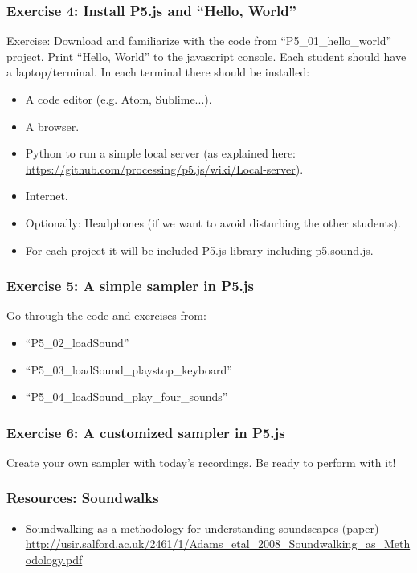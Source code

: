 \documentclass[screen, aspectratio=43]{beamer}
\begin{document}
%
\begin{frame}
  \frametitle{Exercise 4: Install P5.js and ``Hello, World''}
 Exercise: Download and familiarize with the code from ``P5\_01\_hello\_world'' project. Print ``Hello, World'' to the javascript console.
 Each student should have a laptop/terminal. In each terminal there should be installed:
    \begin{itemize}
	\item A code editor (e.g. Atom, Sublime...).
	\item A browser.
	\item Python to run a simple local server (as explained here: \url{https://github.com/processing/p5.js/wiki/Local-server}). 
	\item Internet.
	\item Optionally: Headphones (if we want to avoid disturbing the other students).
	\item For each project it will be included P5.js library including p5.sound.js.
    \end{itemize}
\end{frame}
%
\begin{frame}
  \frametitle{Exercise 5: A simple sampler in P5.js}
  Go through the code and exercises from: 
   \begin{itemize}
  	\item ``P5\_02\_loadSound''
	\item ``P5\_03\_loadSound\_playstop\_keyboard'' 
	\item ``P5\_04\_loadSound\_play\_four\_sounds''
   \end{itemize}
  
  
\end{frame}
%
\begin{frame}
  \frametitle{Exercise 6: A customized sampler in P5.js}
  Create your own sampler with today's recordings. Be ready to perform with it!
\end{frame}
%
\begin{frame}
  \frametitle{Resources: Soundwalks}
    \begin{itemize}
	\item Soundwalking as a methodology for understanding soundscapes (paper)\\ 
	\url{http://usir.salford.ac.uk/2461/1/Adams_etal_2008_Soundwalking_as_Methodology.pdf}
    \end{itemize}    
\end{frame}
\end{document}
